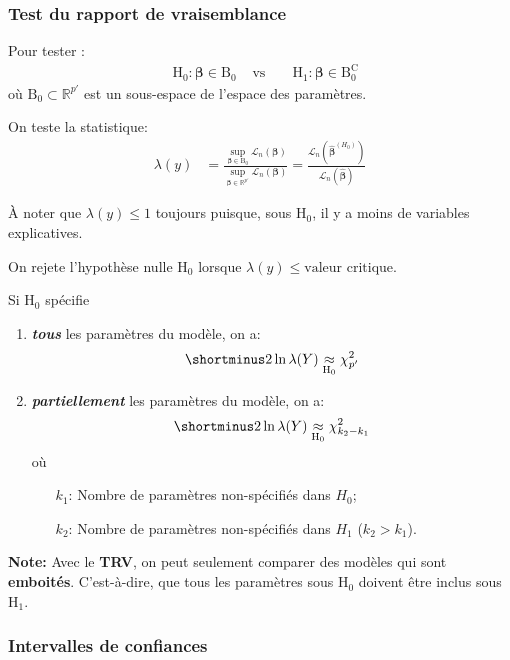\documentclass[10pt, french]{article}
\begin{document}
\begin{multicols*}{3}
\subsubsection*{Test du rapport de vraisemblance}

Pour tester :
\begin{align*}
	&\textrm{H}_{0}: \bm{\beta} \in \textrm{B}_{0} &
	\text{ vs } &
	&\textrm{H}_{1}: \bm{\beta} \in \textrm{B}_{0}^{\textrm{C}} 
\end{align*} 
où $\textrm{B}_{0} \subset \mathds{R}^{p'}$ est un sous-espace de l'espace des paramètres.

On teste la statistique:
\begin{align*}
	\lambda(y) 
	&= 	 \frac{\sup_{\bm{\beta} \in \textrm{B}_{0}}\mathcal{L}_n\left(\bm{\beta}\right)}{\sup_{\bm{\beta} \in \mathds{R}^{p'}}\mathcal{L}_n(\bm{\beta})} 
	= 	 \frac{\mathcal{L}_n\left(\bm{\hat{\beta}}^{(H_0)} \right)}{\mathcal{L}_n(\bm{\hat{\beta}})} 
\end{align*}

À noter que $\lambda(y) \leq 1$ toujours puisque, sous $\textrm{H}_0$, il y a moins de variables explicatives. 

On rejete l'hypothèse nulle $\textrm{H}_0$ lorsque $\lambda(y) \leq \text{valeur critique}$.

Si $\textrm{H}_0$ spécifie
\begin{enumerate}[label=\faAngleRight]
	\item	\textbf{\textit{tous}} les paramètres du modèle, on a:
	\[
		\shortminus 2 \ln \lambda(Y) \underset{\textrm{H}_0}{\approx} \chi_{p'}^2
	\]
	\item 	\textbf{\textit{partiellement}} les paramètres du modèle, on a:
	\[
		\shortminus 2 \ln \lambda(Y) \underset{\textrm{H}_0}{\approx} \chi_{k_2 - k_1}^2
	\]
	où 
	\begin{enumerate}
	\item[$k_1$: ] Nombre de paramètres non-spécifiés dans $H_0$;
	\item[$k_2$: ] Nombre de paramètres non-spécifiés dans $H_1$ ($k_2 > k_1$).
	\end{enumerate}
\end{enumerate}

\textbf{Note: }Avec le \textbf{TRV}, on peut seulement comparer des modèles qui sont \textbf{emboités}. C'est-à-dire, que tous les paramètres sous $\textrm{H}_0$ doivent être inclus sous $\textrm{H}_1$.

\subsubsection*{Intervalles de confiances}


\end{multicols*}
\end{document}

